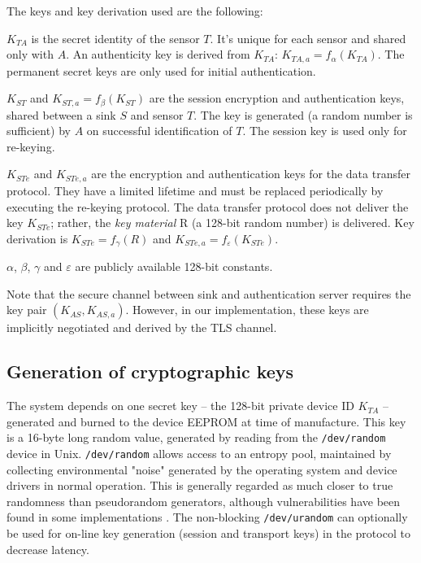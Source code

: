 The keys and key derivation used are the following:
%
\begin{description}

\item $K_{TA}$ is the secret identity of the sensor $T$. It's unique for each sensor and shared only with $A$. An authenticity key is derived from $K_{TA}$: $K_{TA,a} = f_\alpha(K_{TA})$. The permanent secret keys are only used for initial authentication.

\item $K_{ST}$ and $K_{ST,a}=f_\beta(K_{ST})$ are the session encryption and authentication keys, shared between a sink $S$ and sensor $T$. The key is generated (a random number is sufficient) by $A$ on successful identification of $T$. The session key is used only for re-keying.

\item $K_{STe}$ and $K_{STe,a}$ are the encryption and authentication keys for the data transfer protocol. They have a limited lifetime and must be replaced periodically by executing the re-keying protocol. The data transfer protocol does not deliver the key $K_{STe}$; rather, the \textit{key material} R (a 128-bit random number) is delivered. Key derivation is $K_{STe} = f_\gamma(R)$ and $K_{STe,a} = f_\varepsilon(K_{STe})$. 
\end{description}
$\alpha$, $\beta$, $\gamma$ and $\varepsilon$ are publicly available 128-bit constants.

Note that the secure channel between sink and authentication server requires the key pair $(K_{AS},K_{AS,a})$. However, in our implementation, these keys are implicitly negotiated and derived by the TLS channel.

\subsection{Generation of cryptographic keys}

The system depends on one secret key -- the 128-bit private device ID $K_{TA}$ -- generated and burned to the device EEPROM at time of manufacture. This key is a 16-byte long random value, generated by reading from the \texttt{/dev/random} device in Unix. \texttt{/dev/random} allows access to an entropy pool, maintained by collecting environmental "noise" generated by the operating system and device drivers in normal operation. This is generally regarded as much closer to true randomness than pseudorandom generators, although vulnerabilities have been found in some implementations . The non-blocking \texttt{/dev/urandom} can optionally be used for on-line key generation (session and transport keys) in the protocol to decrease latency.

